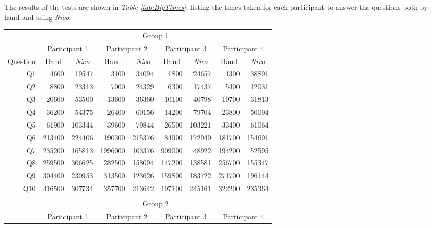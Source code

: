 \documentclass[12pt,twoside,notitlepage,xetex]{report}
\begin{document}
The results of the tests are shown in \emph{Table \ref{tab:BigTimes}}, listing the times taken
for each participant to answer the questions both by hand and using \emph{Nico}.

\begin{center}
\begin{table}[H]
\begin{center}
\begin{tabular}{|r||r|r||r|r||r|r||r|r|}
\cline{2-9}
\multicolumn{1}{c|}{} & \multicolumn{8}{c|}{Group 1}\\ \cline{2-9}
\multicolumn{1}{c|}{} & \multicolumn{2}{c||}{Participant 1} & \multicolumn{2}{c||}{Participant 2} & \multicolumn{2}{c||}{Participant 3} & \multicolumn{2}{c|}{Participant 4}\\ \hline
\multicolumn{1}{|c||}{Question} & \multicolumn{1}{c|}{Hand} & \multicolumn{1}{c||}{\emph{Nico}} & \multicolumn{1}{c|}{Hand} & \multicolumn{1}{c||}{\emph{Nico}} & \multicolumn{1}{c|}{Hand} & \multicolumn{1}{c||}{\emph{Nico}} & \multicolumn{1}{c|}{Hand} & \multicolumn{1}{c|}{\emph{Nico}}\\ \hline \hline
Q1 & 4600 & 19547 & 3100 & 34094 & 1800 & 24657 & 1300 & 38891\\ \hline
Q2 & 8800 & 23313 & 7000 & 24329 & 6300 & 17437 & 5400 & 12031\\ \hline
Q3 & 20600 & 53500 & 13600 & 36360 & 10100 & 40798 & 10700 & 31813\\ \hline
Q4 & 36200 & 54375 & 26400 & 60156 & 14200 & 79704 & 23800 & 50094\\ \hline
Q5 & 61900 & 103344 & 39600 & 79844 & 26500 & 103221 & 33400 & 61064\\ \hline
Q6 & 213400 & 224406 & 190300 & 215376 & 84900 & 172940 & 181700 & 154691\\ \hline
Q7 & 235200 & 165813 & 1996000 & 103376 & 909000 & 48922 & 194200 & 52595\\ \hline
Q8 & 259500 & 306625 & 282500 & 158094 & 147200 & 138581 & 256700 & 155347\\ \hline
Q9 & 304400 & 230953 & 313500 & 123626 & 159800 & 183722 & 271700 & 196144\\ \hline
Q10 & 416500 & 307734 & 357700 & 213642 & 197100 & 245161 & 322200 & 235364\\ \hline
\multicolumn{9}{c}{}\\ \cline{2-9}
\multicolumn{1}{c|}{} & \multicolumn{8}{c|}{Group 2}\\ \cline{2-9}
\multicolumn{1}{c|}{} & \multicolumn{2}{c||}{Participant 1} & \multicolumn{2}{c||}{Participant 2} & \multicolumn{2}{c||}{Participant 3} & \multicolumn{2}{c|}{Participant 4}\\ \hline

\end{tabular}
\end{center}
\end{table}
\end{center}
\end{document}
